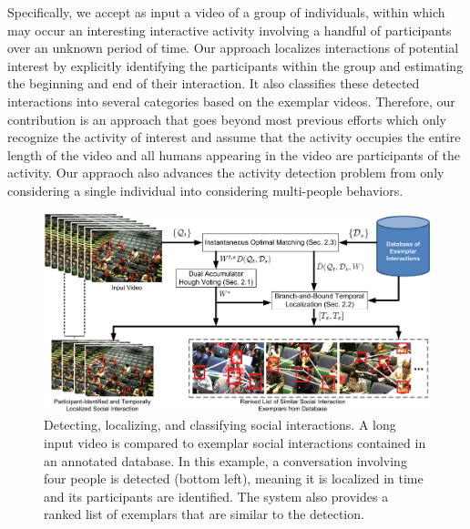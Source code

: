 \documentclass[10pt,twocolumn,letterpaper]{article}
\begin{document}
Specifically, we accept as input a video of a group of individuals, within which may occur an interesting interactive activity involving a handful of participants over an unknown period of time. Our approach localizes interactions of potential interest by explicitly identifying the participants within the group and estimating the beginning and end of their interaction. It also classifies these detected interactions into several categories based on the exemplar videos. Therefore, our  contribution is an approach that goes beyond most previous efforts \cite{Hongeng:act,Gong:act,Hakeem:act,McCowan:meeting,Ni:group,Choi:recogtrack,Intille:act,Vlad:group} which only recognize the activity of interest and assume that the activity occupies the entire length of the video and all humans appearing in the video are participants of the activity. Our appraoch also advances the activity detection problem from only considering a single individual \cite{Ke:detection,Yuan:detection,Shechtman:detection,Hu:detection,Laptev:detection,Duchenne:detection} into considering multi-people behaviors.

\begin{figure}[t]
\begin{center}
\includegraphics[scale=1.5]{diagram.png}
\end{center}
\caption{Detecting, localizing, and classifying social interactions. A long input video is compared to exemplar social interactions contained in an annotated database. In this example, a conversation involving four people is detected (bottom left), meaning it is localized in time and its participants are identified. The system also provides a ranked list of exemplars that are similar to the detection.}
\label{diagram}
\end{figure}
\end{document}

